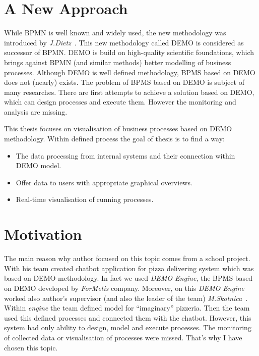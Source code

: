 \section{A New Approach}
While BPMN is well known and widely used, the new methodology was introduced by \textit{J.Dietz}~\cite{dietz-essence-2015}. This new methodology called DEMO is considered as successor of BPMN. DEMO is build on high-quality scientific foundations, which brings against BPMN (and similar methods) better modelling of business processes. Although DEMO is well defined methodology, BPMS based on DEMO does not (nearly) exists. The problem of BPMS based on DEMO is subject of many researches. There are first attempts to achieve a solution based on DEMO, which can design processes and execute them. However the monitoring and analysis are missing.

This thesis focuses on visualisation of business processes based on DEMO methodology. Within defined process the goal of thesis is to find a way:

\begin{itemize}
\item The data processing from internal systems and their connection within DEMO model. 
\item Offer data to users with appropriate graphical overviews.
\item Real-time visualisation of running processes.
\end{itemize}

\section{Motivation}
The main reason why author focused on this topic comes from a school project. With his team created chatbot application for pizza delivering system which was based on DEMO methodology. In fact we used \textit{DEMO Engine}, the BPMS based on DEMO developed by \textit{ForMetis} company. Moreover, on this \textit{DEMO Engine} worked also author's supervisor (and also the leader of the team) \textit{M.Skotnica}~\cite{diploma-skotnica-2016}. Within \textit{engine} the team defined model for ``imaginary'' pizzeria. Then the team used this defined processes and connected them with the chatbot. However, this system had only ability to design, model and execute processes. The monitoring of collected data or visualisation of processes were missed. That's why I have chosen this topic.

